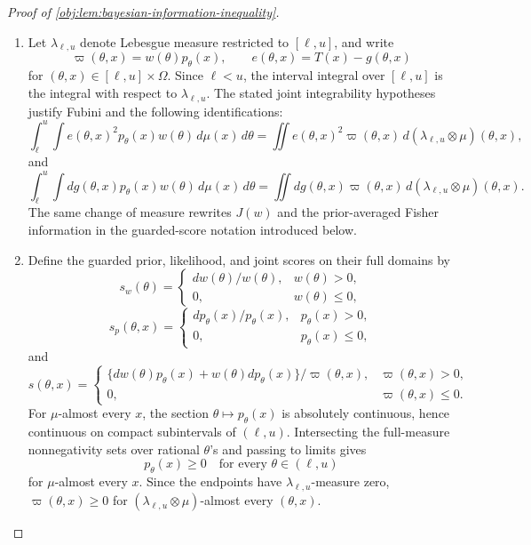 \documentclass[11pt]{article}
\begin{document}
\begin{proof}[Proof of \cref{obj:lem:bayesian-information-inequality}]
\begin{enumerate}
\item Let \(\lambda_{\ell,u}\) denote Lebesgue measure restricted to \([\ell,u]\), and write
\[
\varpi(\theta,x)=w(\theta)p_\theta(x),\qquad
e(\theta,x)=T(x)-g(\theta,x)
\]
for \((\theta,x)\in[\ell,u]\times\Omega\).  Since \(\ell<u\), the interval integral over
\([\ell,u]\) is the integral with respect to \(\lambda_{\ell,u}\).  The stated joint
integrability hypotheses justify Fubini and the following identifications:
\[
\int_\ell^u\int e(\theta,x)^2p_\theta(x)w(\theta)\,d\mu(x)\,d\theta
 =
\iint e(\theta,x)^2\varpi(\theta,x)\,d(\lambda_{\ell,u}\otimes\mu)(\theta,x),
\]
and
\[
\int_\ell^u\int dg(\theta,x)p_\theta(x)w(\theta)\,d\mu(x)\,d\theta
 =
\iint dg(\theta,x)\varpi(\theta,x)\,d(\lambda_{\ell,u}\otimes\mu)(\theta,x).
\]
The same change of measure rewrites \(J(w)\) and the prior-averaged Fisher
information in the guarded-score notation introduced below. %

\item Define the guarded prior, likelihood, and joint scores on their full domains by
\[
s_w(\theta)=
\begin{cases}
dw(\theta)/w(\theta),& w(\theta)>0,\\
0,& w(\theta)\le 0,
\end{cases}
\]
\[
s_p(\theta,x)=
\begin{cases}
dp_\theta(x)/p_\theta(x),& p_\theta(x)>0,\\
0,& p_\theta(x)\le 0,
\end{cases}
\]
and
\[
s(\theta,x)=
\begin{cases}
\{dw(\theta)p_\theta(x)+w(\theta)dp_\theta(x)\}/\varpi(\theta,x),
& \varpi(\theta,x)>0,\\
0,& \varpi(\theta,x)\le 0.
\end{cases}
\]
For \(\mu\)-almost every \(x\), the section \(\theta\mapsto p_\theta(x)\) is absolutely
continuous, hence continuous on compact subintervals of \((\ell,u)\).  Intersecting the
full-measure nonnegativity sets over rational \(\theta\)'s and passing to limits gives
\[
p_\theta(x)\ge 0
\quad\text{for every }\theta\in(\ell,u)
\]
for \(\mu\)-almost every \(x\).  Since the endpoints have
\(\lambda_{\ell,u}\)-measure zero, \(\varpi(\theta,x)\ge0\) for
\((\lambda_{\ell,u}\otimes\mu)\)-almost every \((\theta,x)\). %


\end{enumerate}
\end{proof}
\end{document}
